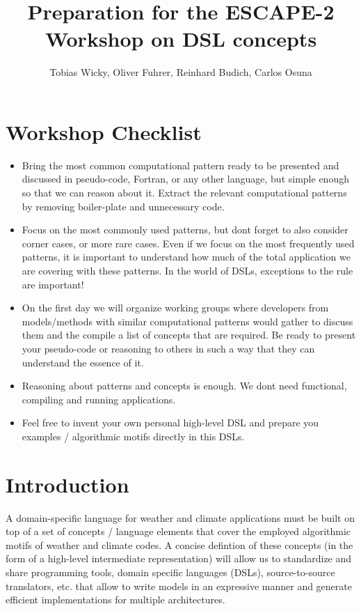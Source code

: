 \documentclass[a4paper,10pt]{scrartcl}
\title{Preparation for the ESCAPE-2 Workshop on DSL concepts}
\author{Tobias Wicky, Oliver Fuhrer, Reinhard Budich, Carlos Osuna}
\begin{document}
\maketitle

\section{Workshop Checklist}

\begin{itemize}
	\item Bring the most common computational pattern ready to be presented and discussed in pseudo-code, Fortran, or any other language, but simple enough so that we can reason about it. Extract the relevant computational patterns by removing boiler-plate and unnecessary code.
	\item Focus on the most commonly used patterns, but dont forget to also consider corner cases, or more rare cases. Even if we focus on the most frequently used patterns, it is important to understand how much of the total application we are covering with these patterns. In the world of DSLs, exceptions to the rule are important!
	\item On the first day we will organize working groups where developers from models/methods with similar computational patterns would gather to discuss them and the compile a list of concepts that are required. Be ready to present your pseudo-code or reasoning to others in such a way that they can understand the essence of it.
	\item Reasoning about patterns and concepts is enough. We dont need functional, compiling and running applications.
	\item Feel free to invent your own personal high-level DSL and prepare you examples / algorithmic motifs directly in this DSLs.
\end{itemize}

\section{Introduction}

A domain-specific language for weather and climate applications must be built on top
of a set of concepts / language elements
that cover the employed algorithmic motifs of weather and climate codes.
A concise defintion of these concepts (in the form of a high-level intermediate representation)
will allow us to standardize and share programming tools, domain specific languages (DSLs),
source-to-source translators, etc. that allow to write
models in an expressive manner and generate efficient implementations
for multiple architectures.
\end{document}
